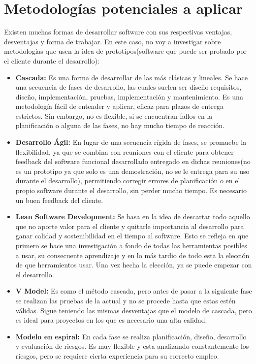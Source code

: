 \section{Metodologías potenciales a aplicar}

Existen muchas formas de desarrollar software con sus respectivas ventajas, desventajas y forma de trabajar. En este caso, no voy a investigar sobre metodologías que usen la idea de prototipos(software que puede ser probado por el cliente durante el desarrollo):

\begin{itemize}
	\item \textbf{Cascada:} Es una forma de desarrollar de las más clásicas y lineales. Se hace una secuencia de fases de desarrollo, las cuales suelen ser diseño requisitos, diseño, implementación, pruebas, implementación y mantenimiento. Es una metodología fácil de entender y aplicar, eficaz para plazos de entrega estrictos. Sin embargo, no es flexible, si se encuentran fallos en la planificación o alguna de las fases, no hay mucho tiempo de reacción.
	\item \textbf{Desarrollo Ágil:} En lugar de una secuencia rígida de fases, se promuebe la flexibilidad, ya que se combina con reuniones con el cliente para obtener feedback del software funcional desarrollado entregado en dichas reuniones(no es un prototipo ya que solo es una demostración, no se le entrega para su uso durante el desarrollo), permitiendo corregir errores de planificación o en el propio software durante el desarrollo, sin perder mucho tiempo. Es necesario un buen feedback del cliente.
	\item \textbf{Lean Software Development: } Se basa en la idea de descartar todo aquello que no aporte valor para el cliente y quitarle importancia al desarrollo para ganar calidad y sostenibilidad en el tiempo al software. Esto se refleja en que primero se hace una investigación a fondo de todas las herramientas posibles a usar, su consecuente aprendizaje y en lo más tardio de todo esta la elección de que herramientos usar. Una vez hecha la elección, ya se puede empezar con el desarrollo.
	\item \textbf{V Model: } Es como el método cascada, pero antes de pasar a la siguiente fase se realizan las pruebas de la actual y no se procede hasta que estas estén válidas. Sigue teniendo las mismas desventajas que el modelo de cascada, pero es ideal para proyectos en los que es necesario una alta calidad.
	\item \textbf{Modelo en espiral: } En cada fase se realiza planificación, diseño, desarrollo y evaluación de riesgos. Es muy flexible y esta analizando constantemente los riesgos, pero se requiere cierta experiencia para su correcto empleo.
\end{itemize}

